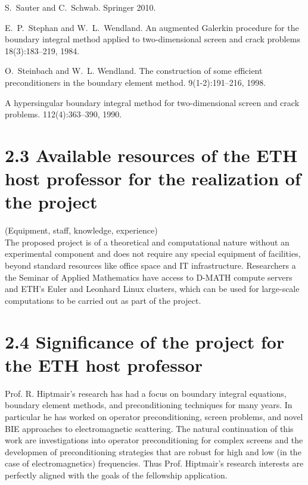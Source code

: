 \documentclass[]{article}
\begin{document}
\begin{small}
\begin{thebibliography}{0}
		S.~Sauter and C.~Schwab.
		\newblock Springer 2010.
		
		E.~P.~Stephan and W.~L.~Wendland.
		\newblock An augmented Galerkin procedure for the boundary integral method applied to two-dimensional screen and crack problems
		 18(3):183--219, 1984.
		
		
		O.~Steinbach and W.~L. Wendland.
		\newblock The construction of some efficient preconditioners in the boundary
		element method.
		 9(1-2):191--216, 1998.
		
		\newblock A hypersingular boundary integral method for two-dimensional screen and crack problems.
		 112(4):363--390, 1990.
		

		
		
	\end{thebibliography}
\end{small}

\section*{2.3 Available resources of the ETH host professor for the realization of the project}
(Equipment, staff, knowledge, experience)\\

The proposed project is of a theoretical and computational nature without an experimental component and does not require any special equipment of facilities, beyond standard resources like office space and IT infrastructure. Researchers a the Seminar of Applied Mathematics have access to D-MATH compute servers and ETH's Euler and Leonhard Linux clusters, which can be used for large-scale computations to be carried out as part of the project.

\section*{2.4 Significance of the project for the ETH host professor} 

Prof. R. Hiptmair's research has had a focus on boundary integral equations, boundary element methods, and preconditioning techniques for many years. In particular he has worked on operator preconditioning, screen problems, and novel BIE approaches to electromagnetic scattering. The natural continuation of this work are investigations into operator preconditioning for complex screens and the developmen of preconditioning strategies that are robust for high and low (in the case of electromagnetics) frequencies. Thus Prof. Hiptmair's research interests are perfectly aligned with the goals of the fellowship application.
\end{document}
